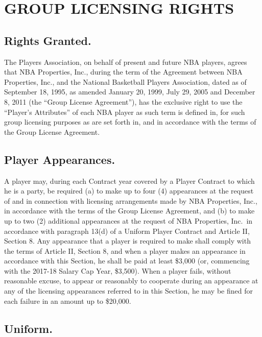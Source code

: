 \documentclass[
]{book}
\begin{document}
\hypertarget{group-licensing-rights}{%
\chapter{GROUP LICENSING RIGHTS}\label{group-licensing-rights}}

\hypertarget{rights-granted.}{%
\section{Rights Granted.}\label{rights-granted.}}

The Players Association, on behalf of present and future NBA players, agrees that NBA Properties, Inc., during the term of the Agreement between NBA Properties, Inc., and the National Basketball Players Association, dated as of September 18, 1995, as amended January 20, 1999, July 29, 2005 and December 8, 2011 (the ``Group License Agreement''), has the exclusive right to use the ``Player's Attributes'' of each NBA player as such term is defined in, for such group licensing purposes as are set forth in, and in accordance with the terms of the Group License Agreement.

\hypertarget{player-appearances.}{%
\section{Player Appearances.}\label{player-appearances.}}

A player may, during each Contract year covered by a Player Contract to which he is a party, be required (a) to make up to four (4) appearances at the request of and in connection with licensing arrangements made by NBA Properties, Inc., in accordance with the terms of the Group License Agreement, and (b) to make up to two (2) additional appearances at the request of NBA Properties, Inc.~in accordance with paragraph 13(d) of a Uniform Player Contract and Article II, Section 8. Any appearance that a player is required to make shall comply with the terms of Article II, Section 8, and when a player makes an appearance in accordance with this Section, he shall be paid at least \$3,000 (or, commencing with the 2017-18 Salary Cap Year, \$3,500). When a player fails, without reasonable excuse, to appear or reasonably to cooperate during an appearance at any of the licensing appearances referred to in this Section, he may be fined for each failure in an amount up to \$20,000.

\hypertarget{uniform.}{%
\section{Uniform.}\label{uniform.}}
\end{document}
